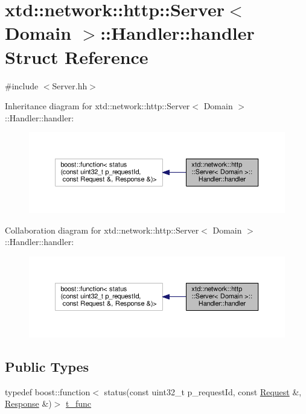 \hypertarget{structxtd_1_1network_1_1http_1_1Server_1_1Handler_1_1handler}{}\section{xtd\+:\+:network\+:\+:http\+:\+:Server$<$ Domain $>$\+:\+:Handler\+:\+:handler Struct Reference}
\label{structxtd_1_1network_1_1http_1_1Server_1_1Handler_1_1handler}


{\ttfamily \#include $<$Server.\+hh$>$}



Inheritance diagram for xtd\+:\+:network\+:\+:http\+:\+:Server$<$ Domain $>$\+:\+:Handler\+:\+:handler\+:
\nopagebreak
\begin{figure}[H]
\begin{center}
\leavevmode
\includegraphics[width=350pt]{structxtd_1_1network_1_1http_1_1Server_1_1Handler_1_1handler__inherit__graph}
\end{center}
\end{figure}


Collaboration diagram for xtd\+:\+:network\+:\+:http\+:\+:Server$<$ Domain $>$\+:\+:Handler\+:\+:handler\+:
\nopagebreak
\begin{figure}[H]
\begin{center}
\leavevmode
\includegraphics[width=350pt]{structxtd_1_1network_1_1http_1_1Server_1_1Handler_1_1handler__coll__graph}
\end{center}
\end{figure}
\subsection*{Public Types}
\begin{DoxyCompactItemize}
\item 
typedef boost\+::function$<$ status(const uint32\+\_\+t p\+\_\+request\+Id, const \hyperlink{classxtd_1_1network_1_1http_1_1Request}{Request} \&, \hyperlink{classxtd_1_1network_1_1http_1_1Response}{Response} \&)$>$ \hyperlink{structxtd_1_1network_1_1http_1_1Server_1_1Handler_1_1handler_acd37ef7fd8a395e1bfa372ad3c025253}{t\+\_\+func}
\end{DoxyCompactItemize}
